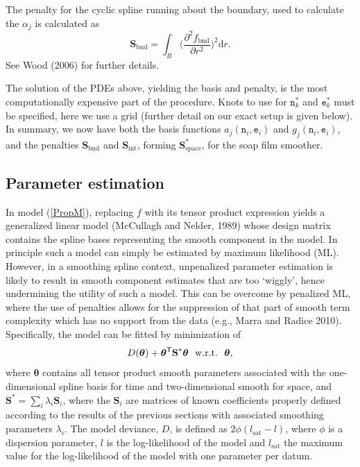 \documentclass[10pt] {article}
\newcommand{\beq}{\begin{equation}}
\newcommand{\eeq}{\end{equation}}
\newcommand{\ts}{^{\sf T}}
\theoremstyle{definition}
\theoremstyle{plain}
\begin{document}
The penalty for the cyclic spline running about the boundary, used to calculate the $\alpha_j$ is calculated as
\beq
\textbf{S}_\text{bnd} = \int_B \Big(\frac{\partial^2 f_\text{bnd}}{\partial r^2}\Big)^2 \text{d}r.
\eeq
See Wood (2006) for further details.

The solution of the PDEs above, yielding the basis and penalty, is the most computationally expensive part of the procedure. Knots to use for $\texttt{n}_k^*$ and $\texttt{e}_k^*$ must be specified, here we use a grid (further detail on our exact setup is given below). In summary, we now have both the basis functions $a_j(\texttt{n}_i,\texttt{e}_i)$ and $g_j(\texttt{n}_i,\texttt{e}_i)$, and the penalties $\textbf{S}_\text{bnd}$ and $\textbf{S}_\text{int}$, forming $\textbf{S}^*_\text{space}$, for the soap film smoother. 

\subsection{Parameter estimation \label{PE}}

In model (\ref{PropM}), replacing $f$ with its tensor product expression yields a generalized linear model (McCullagh and Nelder, 1989) whose design matrix contains the spline bases representing the smooth component in the model. In principle such a model can simply be estimated by maximum likelihood (ML). However, in a smoothing spline context, unpenalized parameter estimation is likely to result in smooth component estimates that are too `wiggly', hence undermining the utility of such a model. This can be overcome by penalized ML, where the use of penalties allows for the suppression of that part of smooth term complexity which has no support from the data (e.g., Marra and Radice 2010). Specifically, the model can be fitted by minimization of
\beq
D(\bm\theta) + \bm\theta\ts\textbf{S}^*\bm\theta \ \  \text{w.r.t.} \ \  \bm\theta,
\label{Dev}
\eeq
where $\bm\theta$ contains all tensor product smooth parameters associated with the one-dimensional spline basis for time and two-dimensional smooth for space, and $\textbf{S}^*=\sum_i \lambda_i \textbf{S}_i$, where the $\textbf{S}_i$ are matrices of known coefficients properly defined according to the results of the previous sections with associated smoothing parameters $\lambda_i$. The model deviance, $D$, is defined as $2\phi(l_{\text{sat}}-l)$, where $\phi$ is a dispersion parameter, $l$ is the log-likelihood of the model and $l_{\text{sat}}$ the maximum value for the log-likelihood of the model with one parameter per datum. 
\end{document}
